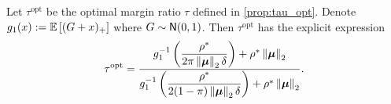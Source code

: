 \begin{prop} \label{prop:tau_optimal}
    Let $\tau^\mathrm{opt}$ be the optimal margin ratio $\tau$ defined in \cref{prop:tau_opt}. Denote $g_1 (x) := \mathbb{E} \left[ (G + x)_+ \right]$ where $G \sim {\sf N}(0, 1)$. Then $\tau^\mathrm{opt}$ has the 
 explicit expression 
\begin{equation}\label{eq:tau_opt}
        \tau^\mathrm{opt} =  \dfrac{g_1^{-1} \left( \dfrac{\rho^*}{2 \pi \left\|{\text{\boldmath $\mu$}}\right\|_2 \delta} \right) + \rho^* \left\|{\text{\boldmath $\mu$}}\right\|_2}{g_1^{-1} \left( \dfrac{\rho^*}{2 (1 - \pi) \left\|{\text{\boldmath $\mu$}}\right\|_2 \delta} \right) + \rho^* \left\|{\text{\boldmath $\mu$}}\right\|_2}.
\end{equation}
\end{prop}
